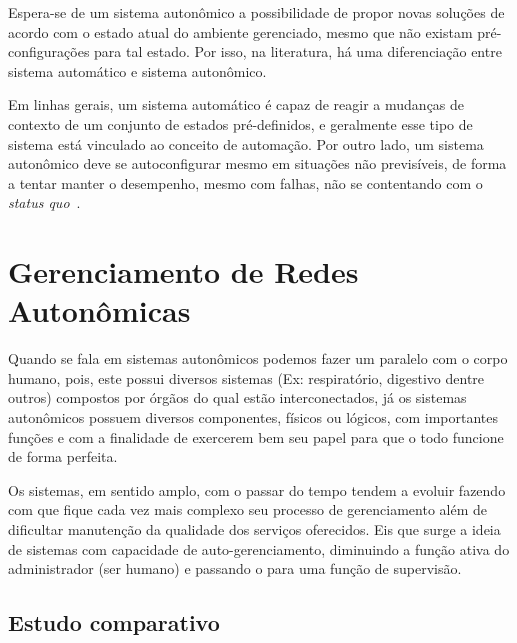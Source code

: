 \documentclass[11pt,twoside]{article}
\begin{document}
Espera-se de um sistema autonômico a possibilidade de propor novas soluções de acordo com o estado atual do ambiente gerenciado, mesmo que não existam pré-configurações para tal estado. Por isso, na literatura, há uma diferenciação entre sistema automático e sistema autonômico. 

Em linhas gerais, um sistema automático é capaz de reagir a mudanças de contexto de um conjunto de estados pré-definidos, e geralmente esse tipo de sistema está vinculado ao conceito de automação. Por outro lado, um sistema autonômico deve se autoconfigurar mesmo em situações não previsíveis, de forma a tentar manter o desempenho, mesmo com falhas, não se contentando com o \textit{status quo}~\cite{GANEK}.


\section{Gerenciamento de Redes Autonômicas}
Quando se fala em sistemas autonômicos podemos fazer um paralelo com o corpo humano, pois, este possui diversos sistemas (Ex: respiratório, digestivo dentre outros) compostos por órgãos do qual estão interconectados, já os sistemas autonômicos possuem diversos componentes, físicos ou lógicos, com importantes funções e com a finalidade de exercerem bem seu papel para que o todo funcione de forma perfeita.

Os sistemas, em sentido amplo, com o passar do tempo tendem a evoluir fazendo com que fique cada vez mais complexo seu processo de gerenciamento além de dificultar manutenção da qualidade dos serviços oferecidos. Eis que surge a ideia de sistemas com capacidade de auto-gerenciamento, diminuindo a função ativa do administrador (ser humano) e passando o para uma função de supervisão.

\subsection{Estudo comparativo}
\end{document}
